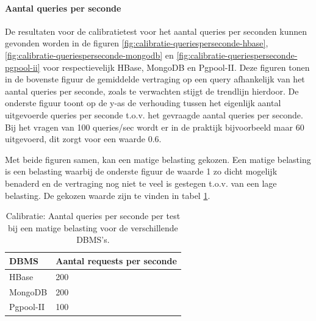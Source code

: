 \paragraph{Aantal queries per seconde}
De resultaten voor de calibratietest voor het aantal queries per seconden kunnen gevonden worden in de figuren \ref{fig:calibratie-queriesperseconde-hbase}, \ref{fig:calibratie-queriesperseconde-mongodb} en \ref{fig:calibratie-queriesperseconde-pgpool-ii} voor respectievelijk HBase, MongoDB en Pgpool-II. Deze figuren tonen in de bovenste figuur de gemiddelde vertraging op een query afhankelijk van het aantal queries per seconde, zoals te verwachten stijgt de trendlijn hierdoor. De onderste figuur toont op de y-as de verhouding tussen het eigenlijk aantal uitgevoerde queries per seconde t.o.v. het gevraagde aantal queries per seconde. Bij het vragen van 100 queries/sec wordt er in de praktijk bijvoorbeeld maar 60 uitgevoerd, dit zorgt voor een waarde $0.6$. 

Met beide figuren samen, kan een matige belasting gekozen. Een matige belasting is een belasting waarbij de onderste figuur de waarde 1 zo dicht mogelijk benaderd en de vertraging nog niet te veel is gestegen t.o.v. van een lage belasting. De gekozen waarde zijn te vinden in tabel \ref{table:calibratie-queriesperseconde-resultaat}.  

\begin{table}[h!]
	\centering
	\begin{tabular}{l| l }
		\textbf{DBMS} & Aantal requests per seconde \\
		\hline
		HBase & 200 \\
		MongoDB & 200\\
		Pgpool-II & 100\\
	\end{tabular}
	\caption{Calibratie: Aantal queries per seconde per test bij een matige belasting voor de verschillende DBMS's.}
	\label{table:calibratie-queriesperseconde-resultaat}
\end{table}

